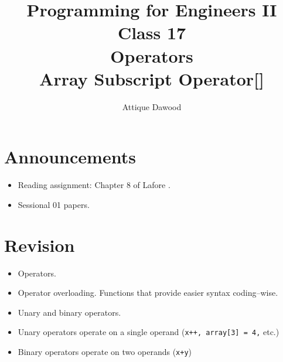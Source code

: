 \documentclass[12pt,a4paper]{article}
\title{\vspace{-2cm}Programming for Engineers II\\Class 17\\Operators\\Array Subscript Operator[]}
\author{Attique Dawood}
\begin{document}
\maketitle
\section{Announcements}
\begin{itemize}
\item Reading assignment: Chapter 8 of Lafore \cite{Lafore}.
\item Sessional 01 papers.
\end{itemize}
\section{Revision}
\begin{itemize}
\item Operators.
\item Operator overloading. Functions that provide easier syntax coding--wise.
\item Unary and binary operators.
\item Unary operators operate on a single operand (\verb|x++, array[3] = 4,| etc.)
\item Binary operators operate on two operands (\verb|x+y|)
\end{itemize}
\end{document}
